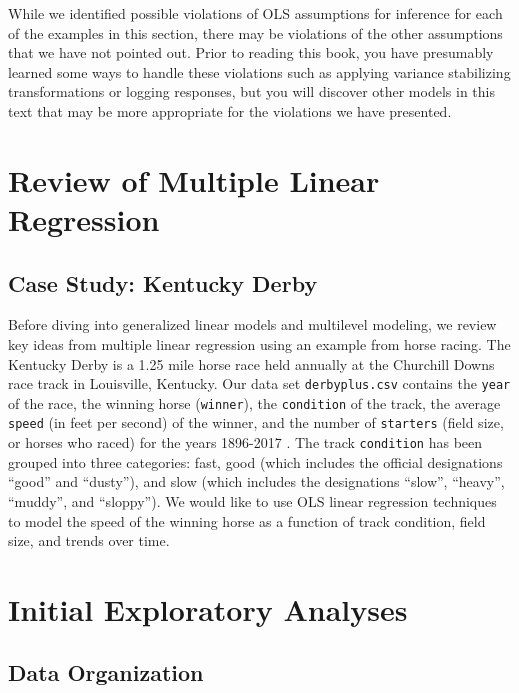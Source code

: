 \documentclass[
]{krantz}
\begin{document}
While we identified possible violations of OLS assumptions for inference for each of the examples in this section, there may be violations of the other assumptions that we have not pointed out. Prior to reading this book, you have presumably learned some ways to handle these violations such as applying variance stabilizing transformations or logging responses, but you will discover other models in this text that may be more appropriate for the violations we have presented.

\hypertarget{review-of-multiple-linear-regression}{%
\section{Review of Multiple Linear Regression}\label{review-of-multiple-linear-regression}}

\hypertarget{cs:derby}{%
\subsection{Case Study: Kentucky Derby}\label{cs:derby}}

Before diving into generalized linear models and multilevel modeling, we review key ideas from multiple linear regression using an example from horse racing. The Kentucky Derby is a 1.25 mile horse race held annually at the Churchill Downs race track in Louisville, Kentucky. Our data set \texttt{derbyplus.csv} contains the \texttt{year} of the race, the winning horse (\texttt{winner}), the \texttt{condition} of the track, the average \texttt{speed} (in feet per second) of the winner, and the number of \texttt{starters} (field size, or horses who raced) for the years 1896-2017 \citep{KentuckyDerby}. The track \texttt{condition} has been grouped into three categories: fast, good (which includes the official designations ``good'' and ``dusty''), and slow (which includes the designations ``slow'', ``heavy'', ``muddy'', and ``sloppy''). We would like to use OLS linear regression techniques to model the speed of the winning horse as a function of track condition, field size, and trends over time.

\hypertarget{explore}{%
\section{Initial Exploratory Analyses}\label{explore}}

\hypertarget{data-organization}{%
\subsection{Data Organization}\label{data-organization}}
\end{document}

